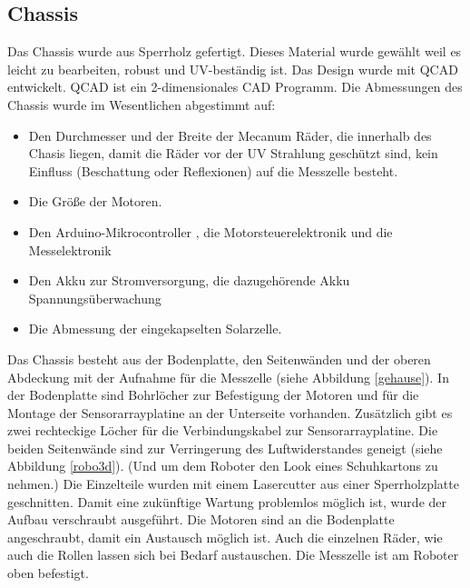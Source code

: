 \documentclass[a4paper,bibtotoc,oneside]{scrbook}
\begin{document}
\subsection{Chassis}\thispagestyle{empty}

\noindent Das Chassis wurde aus Sperrholz gefertigt. Dieses Material wurde gewählt weil es leicht zu bearbeiten, robust und UV-beständig ist. Das Design wurde mit QCAD entwickelt. QCAD ist ein 2-dimensionales CAD Programm. 
Die Abmessungen des Chassis wurde im Wesentlichen abgestimmt auf: \begin{itemize}
\item Den Durchmesser und der Breite der Mecanum Räder, die innerhalb des Chasis liegen, damit die Räder vor der UV Strahlung geschützt sind, kein Einfluss (Beschattung oder Reflexionen) auf die Messzelle besteht.
\item Die Größe der Motoren.
\item Den Arduino-Mikrocontroller , die Motorsteuerelektronik und die Messelektronik
\item Den Akku zur Stromversorgung, die dazugehörende Akku Spannungsüberwachung 
\item Die Abmessung der eingekapselten Solarzelle.
 \end{itemize}

Das Chassis besteht aus der Bodenplatte, den Seitenwänden und der oberen Abdeckung mit der Aufnahme für die Messzelle (siehe Abbildung \ref{gehause}). In der Bodenplatte sind Bohrlöcher zur Befestigung der Motoren und für die Montage der Sensorarrayplatine an der Unterseite vorhanden. Zusätzlich gibt es zwei rechteckige Löcher für die Verbindungskabel zur Sensorarrayplatine. Die beiden Seitenwände sind zur Verringerung des Luftwiderstandes geneigt (siehe Abbildung \ref{robo3d}). (Und um dem Roboter den Look eines Schuhkartons zu nehmen.)
\noindent Die Einzelteile wurden mit einem Lasercutter aus einer Sperrholzplatte geschnitten. Damit eine zukünftige Wartung problemlos möglich ist, wurde der Aufbau verschraubt ausgeführt. 
Die Motoren sind an die Bodenplatte angeschraubt, damit ein Austausch möglich ist. Auch die einzelnen Räder, wie auch die Rollen lassen sich bei Bedarf austauschen. 
Die Messzelle ist am Roboter oben befestigt.
\end{document}
